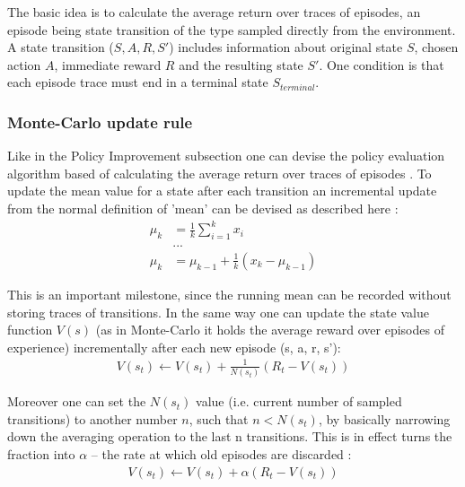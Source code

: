 The basic idea is to calculate the average return over traces of episodes, an episode being state transition of the type sampled directly from the environment. A state transition ($S, A, R, S'$) includes information about original state $S$, chosen action $A$, immediate reward $R$ and the resulting state $S'$. One condition is that each episode trace must end in a terminal state $S_{terminal}$. 

\subsubsection{Monte-Carlo update rule}

Like in the Policy Improvement subsection one can devise the policy evaluation algorithm based of calculating the average return over traces of episodes \cite{lecture_mfl}. 
To update the mean value for a state after each transition an incremental update from the normal definition of 'mean' can be devised as described here \cite{lecture_mfl} :
\begin{align}
    \mu_k &= \frac{1}{k}\sum^{k}_{i = 1} x_i \nonumber \\
    &... \nonumber \\
    \mu_k &= \mu_{k - 1} + \frac{1}{k} (x_k - \mu_{k - 1})
\end{align}

This is an important milestone, since the running mean can be recorded without storing traces of transitions. In the same way one can update the state value function $V(s)$ (as in Monte-Carlo it holds the average reward over episodes of experience) incrementally after each new episode (s, a, r, s'):
\begin{align}
    V(s_t) \longleftarrow V(s_t) + \frac{1}{N(s_t)}(R_t - V(s_t))
\end{align}

Moreover one can set the $N(s_t)$ value (i.e. current number of sampled transitions) to another number $n$, such that $n < N(s_t)$, by basically narrowing down the averaging operation to the last n transitions. This is in effect turns the fraction into $\alpha$ -- the rate at which old episodes are discarded \cite{lecture_mfl}:
\begin{align}
    V(s_t) \longleftarrow V(s_t) + \alpha (R_t - V(s_t)) \label{eq:mc_increment}
\end{align}


